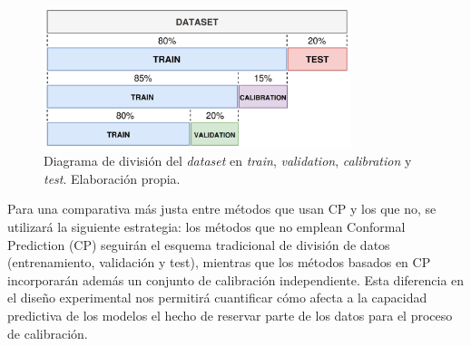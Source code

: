 \begin{figure}[h]
    \centering
    \includegraphics[width=0.8\textwidth]{capitulos/cap_04/imagenes/data_split_conformal.png}
    \caption[
        Diagrama de división del \textit{dataset} en \textit{train}, \textit{validation}, \textit{calibration} 
        y \textit{test}.
    ]{
        Diagrama de división del \textit{dataset} en \textit{train}, \textit{validation}, \textit{calibration}
        y \textit{test}. Elaboración propia.
    } 
    \label{fig:data_split_conformal}
\end{figure}

Para una comparativa más justa entre métodos que usan CP y los que no, se utilizará la siguiente estrategia: 
los métodos que no emplean Conformal Prediction (CP) seguirán el esquema tradicional de división de datos 
(entrenamiento, validación y test), mientras que los métodos basados en CP incorporarán además un conjunto 
de calibración independiente. Esta diferencia en el diseño experimental nos permitirá cuantificar cómo afecta 
a la capacidad predictiva de los modelos el hecho de reservar parte de los datos para el proceso de 
calibración.








